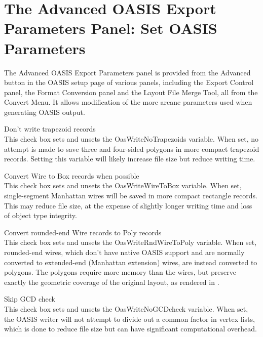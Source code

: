 \section{The {\cb Advanced OASIS Export Parameters} Panel: Set\newline
  OASIS Parameters}
\label{oasadv}
The {\cb Advanced OASIS Export Parameters} panel is provided from the
{\cb Advanced} button in the {\cb OASIS} setup page of various panels,
including the {\cb Export Control} panel, the {\cb Format Conversion}
panel and the {\cb Layout File Merge Tool}, all from the {\cb Convert
Menu}.  It allows modification of the more arcane parameters used when
generating OASIS output.

\begin{description}
\item{\cb Don't write trapezoid records}\\
This check box sets and unsets the {\et OasWriteNoTrapezoids}
variable.  When set, no attempt is made to save three and four-sided
polygons in more compact trapezoid records.  Setting this variable
will likely increase file size but reduce writing time.

\item{\cb Convert Wire to Box records when possible}\\
This check box sets and unsets the {\et OasWriteWireToBox} variable. 
When set, single-segment Manhattan wires will be saved in more compact
rectangle records.  This may reduce file size, at the expense of
slightly longer writing time and loss of object type integrity.

\item{\cb Convert rounded-end Wire records to Poly records}\\
This check box sets and unsets the {\et OasWriteRndWireToPoly}
variable.  When set, rounded-end wires, which don't have native OASIS
support and are normally converted to extended-end (Manhattan
extension) wires, are instead converted to polygons.  The polygons
require more memory than the wires, but preserve exactly the geometric
coverage of the original layout, as rendered in {\Xic}.

\item{\cb Skip GCD check}\\
This check box sets and unsets the {\et OasWriteNoGCDcheck} variable. 
When set, the OASIS writer will not attempt to divide out a common
factor in vertex lists, which is done to reduce file size but can have
significant computational overhead.


\end{description}
